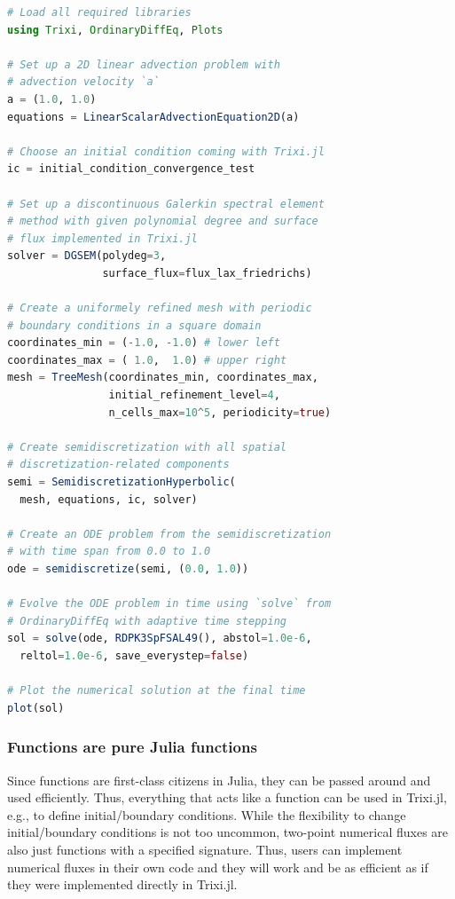 \documentclass{juliacon}
\makeatletter
\newcommand{\eg}[0]{{e.g.\@}\xspace}
\newcommand{\trixi}{Trixi.jl\xspace}
\makeatother
\begin{document}
\begin{lstlisting}[language = Julia]
# Load all required libraries
using Trixi, OrdinaryDiffEq, Plots

# Set up a 2D linear advection problem with
# advection velocity `a`
a = (1.0, 1.0)
equations = LinearScalarAdvectionEquation2D(a)

# Choose an initial condition coming with Trixi.jl
ic = initial_condition_convergence_test

# Set up a discontinuous Galerkin spectral element
# method with given polynomial degree and surface
# flux implemented in Trixi.jl
solver = DGSEM(polydeg=3,
               surface_flux=flux_lax_friedrichs)

# Create a uniformely refined mesh with periodic
# boundary conditions in a square domain
coordinates_min = (-1.0, -1.0) # lower left
coordinates_max = ( 1.0,  1.0) # upper right
mesh = TreeMesh(coordinates_min, coordinates_max,
                initial_refinement_level=4,
                n_cells_max=10^5, periodicity=true)

# Create semidiscretization with all spatial
# discretization-related components
semi = SemidiscretizationHyperbolic(
  mesh, equations, ic, solver)

# Create an ODE problem from the semidiscretization
# with time span from 0.0 to 1.0
ode = semidiscretize(semi, (0.0, 1.0))

# Evolve the ODE problem in time using `solve` from
# OrdinaryDiffEq with adaptive time stepping
sol = solve(ode, RDPK3SpFSAL49(), abstol=1.0e-6,
  reltol=1.0e-6, save_everystep=false)

# Plot the numerical solution at the final time
plot(sol)
\end{lstlisting}

\subsubsection{Functions are pure Julia functions}

Since functions are first-class citizens in Julia, they can be passed around
and used efficiently. Thus, everything that acts like a function can be used
in \trixi, \eg, to define initial/boundary conditions. While the flexibility
to change initial/boundary conditions
is not too uncommon, two-point numerical fluxes are also just functions with a
specified signature. Thus, users can implement numerical fluxes in their
own code and they will work and be as efficient as if they were implemented
directly in \trixi.
\end{document}
